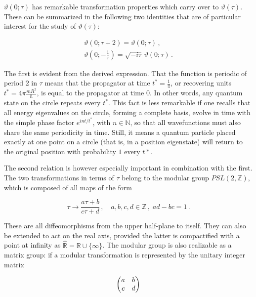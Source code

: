 \documentclass{article}
\newcommand{\T}{\ensuremath{\vartheta}}
\begin{document}
$\vartheta(0;\tau)$ has remarkable transformation properties which carry over to $\T(\tau)$. These can be summarized in the following two identities that are of particular interest for the study of $\T(\tau)$:

\begin{align}
    \vartheta(0; \tau + 2) = \vartheta(0; \tau)\,, \label{t2map}\\
    \vartheta(0; -\tfrac{1}{\tau}) = \sqrt{-i\tau} \, \vartheta(0; \tau)\,. \label{smap}
\end{align}

The first is evident from the derived expression. That the function is periodic of period $2$ in $\tau$ means that the propagator at time $t^* = \frac{1}{\pi}$, or recovering units $t^* = 4\pi \frac{mR^2}{\hbar}$, is equal to the propagator at time $0$. In other words, any quantum state on the circle repeats every $t^*$. This fact is less remarkable if one recalls that all energy eigenvalues on the circle, forming a complete basis, evolve in time with the simple phase factor $e^{int/t^*}$, with $n\in \mathbb{N}$, so that all wavefunctions must also share the same periodicity in time. Still, it means a quantum particle placed exactly at one point on a circle (that is, in a position eigenstate) will return to the original position with probability $1$ every $t*$.

\newcommand{\modg}{PSL(2,\mathbb{Z})}

The second relation is however especially important in combination with the first. The two transformations in terms of $\tau$ belong to the modular group $\modg$, which is composed of all maps of the form

\begin{equation}
    \tau \rightarrow \frac{a \tau + b}{c\tau + d}\,, \quad a,b,c,d \in \mathbb{Z}\,,\; ad - bc = 1\,.
\end{equation}

These are all diffeomorphisms from the upper half-plane to itself. They can also be extended to act on the real axis, provided the latter is compactified with a point at infinity as $\hat{\mathbb{R}} = \mathbb{R} \cup \{\infty\}$. The modular group is also realizable as a matrix group: if a modular transformation is represented by the unitary integer matrix

\begin{equation}
    \mqty( a & b \\ c & d)
\end{equation}
\end{document}
